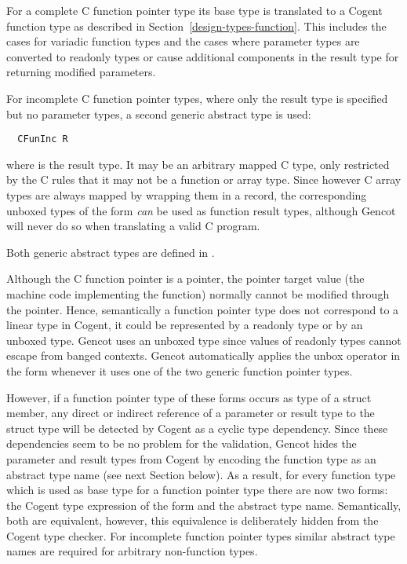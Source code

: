 For a complete C function pointer type its base type is translated to a Cogent function type as described in
Section~\ref{design-types-function}. This includes the cases for variadic function types and the cases where
parameter types are converted to readonly types or cause additional components in the result type for returning 
modified parameters.

For incomplete C function pointer types, where only the result type
is specified but no parameter types, a second generic abstract type is used:
\begin{verbatim}
  CFunInc R
\end{verbatim}
where  is the result type. It may be an arbitrary 
mapped C type, only restricted by the C rules that it may not be a function or array type. Since however C array types
are always mapped by wrapping them in a record, the corresponding unboxed types of the form 
\textit{can} be used as function result types, although Gencot will never do so when translating a valid C program.

Both generic abstract types are defined in .

Although the C function pointer is a pointer, the pointer target value (the machine code implementing the function) 
normally cannot be modified through the pointer. Hence, semantically a function pointer type does not correspond to a linear type
in Cogent, it could be represented by a readonly type or by an unboxed type. Gencot uses an unboxed type
since values of readonly types cannot escape from banged contexts. Gencot automatically applies the 
unbox operator in the form  whenever it uses one of the two generic function pointer types.

However, if a function pointer type of these forms occurs as type of a struct member, any direct or indirect reference of a
parameter or result type to the struct type will be detected by Cogent as a cyclic type dependency. Since 
these dependencies seem to be no problem for the validation, Gencot hides the parameter and result types from
Cogent by encoding the function type as an abstract type name (see next Section below). As a result, for 
every function type which is used as base type for a function pointer type there are now two forms: the Cogent
type expression of the form  and the abstract type name. Semantically, both are equivalent, however,
this equivalence is deliberately hidden from the Cogent type checker. For incomplete function pointer types similar
abstract type names are required for arbitrary non-function types.


